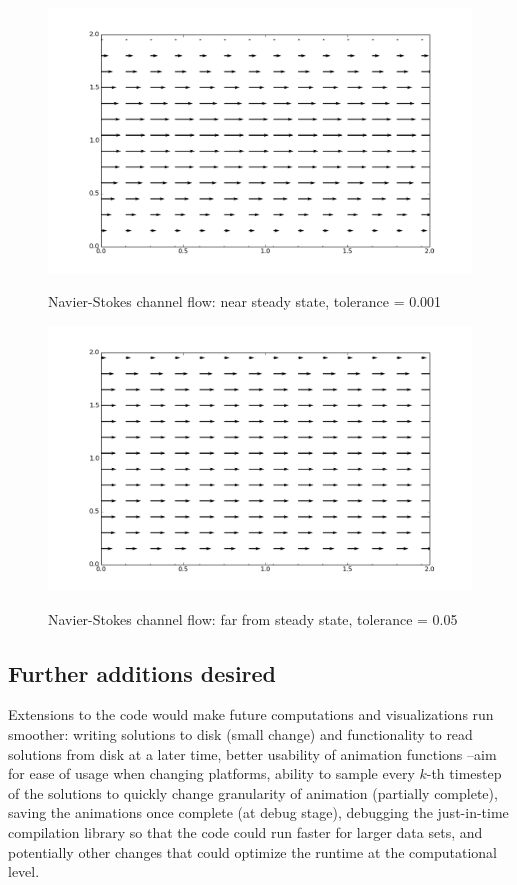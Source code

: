 \documentclass[11pt]{article}
\begin{document}
{	\begin{figure}[H]
	\centering
	\caption{Navier-Stokes channel flow: near steady state, tolerance = 0.001}
	\includegraphics[scale=0.39]{channel_steady.png}
	\label{fig:channel_steady}
	\end{figure}

	\begin{figure}[H]
	\centering
	\caption{Navier-Stokes channel flow: far from steady state, tolerance = 0.05}
	\includegraphics[scale=0.39]{channel_not-yet.png}
	\label{fig:channel_not-yet}
	\end{figure}

\subsection*{Further additions desired}
Extensions to the code would make future computations and visualizations
run smoother: writing solutions to disk (small change) and functionality to read solutions
from disk at a later time, better usability of animation functions --aim for ease of usage
when changing platforms, ability to sample every $k$-th timestep of the solutions to
quickly change granularity of animation (partially complete), saving the animations once
complete (at debug stage), debugging the just-in-time compilation library so that the code
could run faster for larger data sets, and potentially other changes that could optimize the
runtime at the computational level.

}
\end{document}
